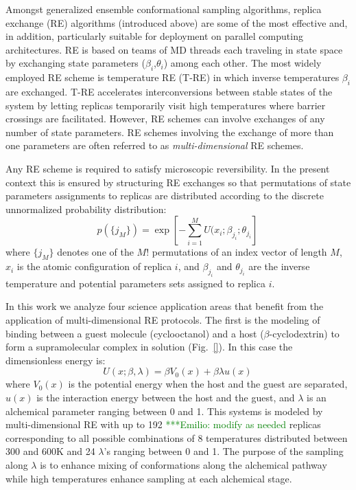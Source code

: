 \documentclass{sig-alternate}
\newcommand{\egnote}[1]{ {\textcolor{green} { ***Emilio: #1 }}}
\begin{document}
Amongst generalized ensemble conformational sampling algorithms, replica exchange (RE)
algorithms (introduced above) are some of the most effective and, in addition,
particularly suitable for deployment on parallel computing architectures. RE is based on
teams of MD threads each traveling in state space by exchanging state parameters
($\beta_i$,$\theta_i$) among each other.  The most widely employed RE scheme is
temperature RE (T-RE) in which inverse temperatures $\beta_i$ are exchanged. T-RE
accelerates interconversions between stable states of the system by letting replicas
temporarily visit high temperatures where barrier crossings are facilitated. However, RE
schemes can involve exchanges of any number of state parameters. RE schemes involving
the exchange of more than one parameters are often referred to as
\emph{multi-dimensional} RE schemes.

Any RE scheme is required to satisfy microscopic reversibility. In the present context
this is ensured by structuring RE exchanges so that permutations of state parameters
assignments to replicas are distributed according to the discrete unnormalized
probability distribution:
\begin{equation}
p(\{j_M\})=\exp\left[-\sum_{i=1}^M U(x_i;\beta_{j_i};\theta_{j_i}\right] \,
\end{equation}
where $\{j_M\}$ denotes one of the $M!$ permutations of an index vector of length $M$,  $x_i$ is the atomic configuration of replica $i$, and $\beta_{j_i}$ and $\theta_{j_i}$ are the inverse temperature and potential parameters sets assigned to replica $i$.

In this work we analyze four science application areas that benefit from the application of multi-dimensional RE protocols. The first is the modeling of binding between a guest molecule (cyclooctanol) and a host ($\beta$-cyclodextrin) to form a supramolecular complex in solution (Fig.\ \ref{}). In this case the dimensionless energy is:
\begin{equation}
U(x;\beta,\lambda) = \beta V_0(x) + \beta \lambda u(x) \,
\end{equation}
where $V_0(x)$ is the potential energy when the host and the guest are separated, $u(x)$ is the interaction energy between the host and the guest, and $\lambda$ is an alchemical parameter ranging between 0 and 1. This systems is modeled by multi-dimensional RE with up to 192 \egnote{modify as needed} replicas corresponding to all possible combinations of 8 temperatures distributed between 300 and 600K and 24 $\lambda$'s ranging between 0 and 1. The purpose of the sampling along $\lambda$ is to enhance mixing of conformations along the alchemical pathway while high temperatures enhance sampling at each alchemical stage.
\end{document}
